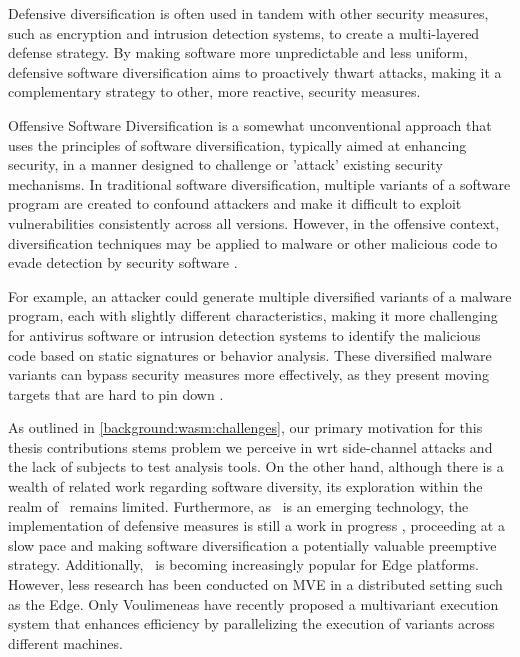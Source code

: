 Defensive diversification is often used in tandem with other security measures, such as encryption and intrusion detection systems, to create a multi-layered defense strategy. 
By making software more unpredictable and less uniform, defensive software diversification aims to proactively thwart attacks, making it a complementary strategy to other, more reactive, security measures.


Offensive Software Diversification is a somewhat unconventional approach that uses the principles of software diversification, typically aimed at enhancing security, in a manner designed to challenge or 'attack' existing security mechanisms. 
In traditional software diversification, multiple variants of a software program are created to confound attackers and make it difficult to exploit vulnerabilities consistently across all versions. 
However, in the offensive context, diversification techniques may be applied to malware or other malicious code to evade detection by security software \cite{wobfuscator}.

For example, an attacker could generate multiple diversified variants of a malware program, each with slightly different characteristics, making it more challenging for antivirus software or intrusion detection systems to identify the malicious code based on static signatures or behavior analysis. 
These diversified malware variants can bypass security measures more effectively, as they present moving targets that are hard to pin down \cite{MTDNationalCyberLaep}.


\label{sota:openchallenges}

As outlined in \autoref{background:wasm:challenges}, our primary motivation for this thesis contributions stems problem we perceive in \wasm wrt side-channel attacks and the lack of \wasm subjects to test analysis tools. 
On the other hand, although there is a wealth of related work regarding software diversity, its exploration within the realm of \wasm\ remains limited. 
Furthermore, as \wasm\ is an emerging technology, the implementation of defensive measures is still a work in progress \cite{Narayan2021Swivel, johnson2021}, proceeding at a slow pace and making software diversification a potentially valuable preemptive strategy. 
Additionally, \wasm\ is becoming increasingly popular for Edge platforms. 
However, less research has been conducted on MVE in a distributed setting such as the Edge. Only Voulimeneas \etal \cite{voulimeneas2021dmvx} have recently proposed a multivariant execution system that enhances efficiency by parallelizing the execution of variants across different machines.






